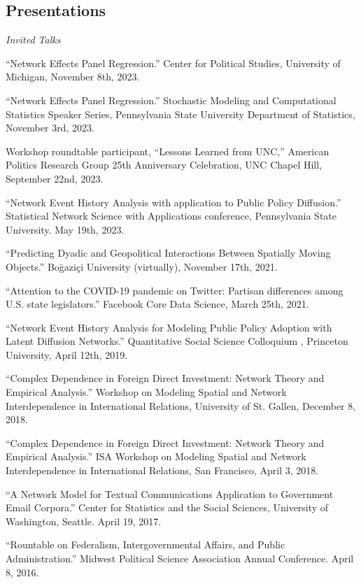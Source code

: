 \documentclass[overlapped,line]{res}
\begin{document}
\begin{resume}
\section{\bf Presentations}
\vspace{.1cm}
\hspace{-1cm} \emph{Invited Talks}
\begin{etaremune} 
\item ``Network Effects Panel Regression.'' Center for Political Studies, University of Michigan, November 8th, 2023.
\item ``Network Effects Panel Regression.'' Stochastic Modeling and Computational Statistics Speaker Series, Pennsylvania State University Department of Statistics, November 3rd, 2023.
\item Workshop roundtable participant, ``Lessons Learned from UNC,'' American Politics Research Group 25th Anniversary Celebration, UNC Chapel Hill, September 22nd, 2023. 
\item ``Network Event History Analysis with application to Public Policy Diffusion.'' Statistical Network Science with Applications conference, Pennsylvania State University. May 19th, 2023.
\item ``Predicting Dyadic and Geopolitical Interactions Between Spatially Moving Objects.'' Boğaziçi University (virtually), November 17th, 2021.
\item ``Attention to the COVID-19 pandemic on Twitter: Partisan differences among U.S. state legislators.'' Facebook Core Data Science, March 25th, 2021.
\item ``Network Event History Analysis for Modeling Public Policy Adoption with Latent Diffusion Networks.''  Quantitative Social Science Colloquium , Princeton University, April 12th, 2019.
\item ``Complex Dependence in Foreign Direct Investment: Network Theory and Empirical Analysis.'' Workshop on Modeling Spatial and Network Interdependence in International Relations, University of St. Gallen, December 8, 2018.
\item ``Complex Dependence in Foreign Direct Investment: Network Theory and Empirical Analysis.'' ISA Workshop on Modeling Spatial and Network Interdependence in International Relations, San Francisco, April 3, 2018.
\item ``A Network Model for Textual Communications Application to Government Email Corpora.'' Center for Statistics and the Social Sciences, University of Washington, Seattle. April 19, 2017.
\item ``Rountable on Federalism, Intergovernmental Affairs, and Public Administration.'' Midwest Political Science Association Annual Conference. April 8, 2016. 

\end{etaremune}
\end{resume}
\end{document}
